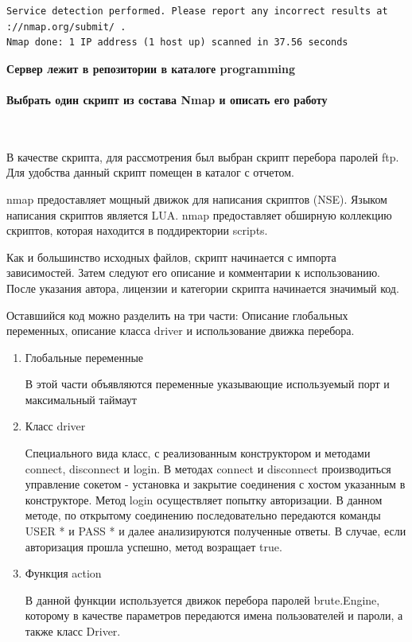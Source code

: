 \documentclass{article}
\begin{document}
\begin{enumerate}
\begin{verbatim}
Service detection performed. Please report any incorrect results at 
://nmap.org/submit/ .
Nmap done: 1 IP address (1 host up) scanned in 37.56 seconds
\end{verbatim}

\textbf{Сервер лежит в репозитории в каталоге programming}
\end{enumerate}


\paragraph{Выбрать один скрипт из состава Nmap и описать его работу}
~

В качестве скрипта, для рассмотрения был выбран скрипт перебора паролей ftp. Для удобства данный скрипт помещен в каталог с отчетом.

nmap предоставляет мощный движок для написания скриптов (NSE). Языком написания скриптов является LUA. nmap предоставляет обширную коллекцию скриптов, которая находится в поддиректории scripts.

Как и большинство исходных файлов, скрипт начинается с импорта зависимостей. Затем следуют его описание и комментарии к использованию. После указания автора, лицензии и категории скрипта начинается значимый код.

Оставшийся код можно разделить на три части:
Описание глобальных переменных, описание класса driver и использование движка перебора.

\begin{enumerate}
\item  Глобальные переменные

В этой части объявляются переменные указывающие используемый порт и  максимальный таймаут

\item Класс driver

Специального вида класс, с реализованным конструктором и методами connect, disconnect и login. В методах connect и disconnect производиться управление сокетом - установка и закрытие соединения с хостом указанным в конструкторе. Метод login осуществляет попытку авторизации. В данном методе, по открытому соединению последовательно передаются команды USER * и PASS * и далее анализируются полученные ответы. В случае, если авторизация прошла успешно, метод возращает true.

\item Функция action

В данной функции используется движок перебора паролей brute.Engine, которому в качестве параметров передаются имена пользователей и пароли, а также класс Driver.
\end{enumerate}
\end{document}
